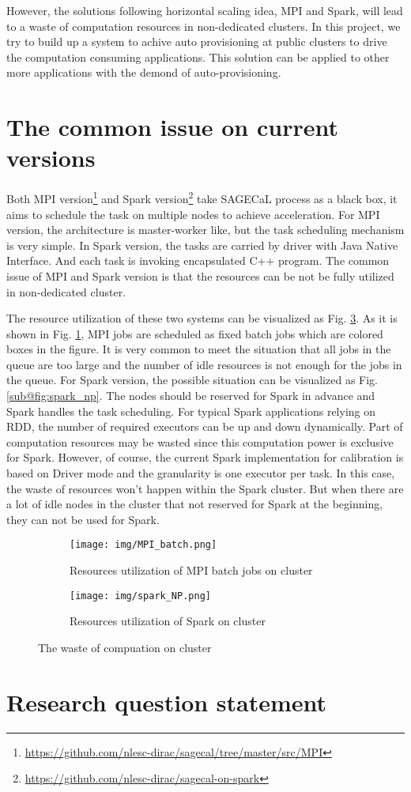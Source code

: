 \documentclass[sigchi]{acmart}
\begin{document}
However, the solutions following horizontal scaling idea, MPI and Spark, will lead to a waste of computation resources in non-dedicated clusters.
In this project, we try to build up a system to achive auto provisioning at public clusters to drive the computation consuming applications. This solution can be applied to other more applications with the demond of auto-provisioning.

\section{The common issue on current versions}
Both MPI version\footnote{\url{https://github.com/nlesc-dirac/sagecal/tree/master/src/MPI}} and Spark version\footnote{\url{https://github.com/nlesc-dirac/sagecal-on-spark}} take SAGECaL process as a black box, it aims to schedule the task on multiple nodes to achieve acceleration. 
For MPI version, the architecture is master-worker like, but the task scheduling mechanism is very simple. In Spark version, the tasks are carried by driver with Java Native Interface. And each task is invoking encapsulated C++ program.
The common issue of MPI and Spark version is that the resources can be not be fully utilized in non-dedicated cluster. 

The resource utilization of these two systems can be visualized as Fig. \ref{fig:waste_cluster}. As it is shown in Fig. \ref{fig:MPI_batch}, MPI jobs are scheduled as fixed batch jobs which are colored boxes in the figure. It is very common to meet the situation that all jobs in the queue are too large and the number of idle resources is not enough for the jobs in the queue. 
For Spark version, the possible situation can be visualized as Fig. \ref{sub@fig:spark_np}. The nodes should be reserved for Spark in advance and Spark handles the task scheduling. For typical Spark applications relying on RDD, the number of required executors can be up and down dynamically. Part of computation resources may be wasted since this computation power is exclusive for Spark.
However, of course, the current Spark implementation for calibration is based on Driver mode and the granularity is one executor per task. In this case, the waste of resources won't happen within the Spark cluster. But when there are a lot of idle nodes in the cluster that not reserved for Spark at the beginning, they can not be used for Spark. 
\begin{figure}[h!]
  \begin{subfigure}[b]{0.45\textwidth}
      \texttt{[image: img/MPI\_batch.png]}
      \caption{Resources utilization of MPI batch jobs on cluster}
      \label{fig:MPI_batch}
  \end{subfigure}
  \begin{subfigure}[b]{0.45\textwidth}
      \texttt{[image: img/spark\_NP.png]}
      \caption{Resources utilization of Spark on cluster}
      \label{fig:spark_np}
  \end{subfigure}
  \caption{The waste of compuation on cluster}\label{fig:waste_cluster}
\end{figure}

\section{Research question statement}
 
\newpage


\end{document}
